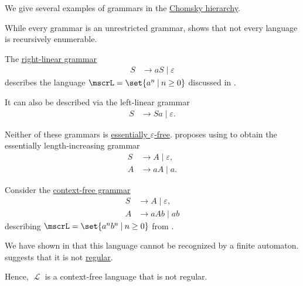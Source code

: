 \begin{example}\label{ex:def:chomsky_hierarchy}
  We give several examples of grammars in the \hyperref[def:chomsky_hierarchy]{Chomsky hierarchy}.

  \begin{thmenum}
     While every grammar is an unrestricted grammar,  shows that not every language is recursively enumerable.

     The \hyperref[def:chomsky_hierarchy/regular]{right-linear grammar}
    \begin{equation*}
      \begin{aligned}
        S &\to aS \mid \varepsilon
      \end{aligned}
    \end{equation*}
    describes the language \( \mscrL = \set{ a^n \given n \geq 0 } \) discussed in .

    It can also be described via the left-linear grammar
    \begin{equation*}
      \begin{aligned}
        S &\to Sa \mid \varepsilon.
      \end{aligned}
    \end{equation*}

    Neither of these grammars is \hyperref[def:epsilon_free_grammar]{essentially \( \varepsilon \)-free}.  proposes using  to obtain the essentially length-increasing grammar
    \begin{equation*}
      \begin{aligned}
        S &\to A \mid \varepsilon, \\
        A &\to aA \mid a.
      \end{aligned}
    \end{equation*}

     Consider the \hyperref[def:chomsky_hierarchy/context_free]{context-free grammar}
    \begin{equation*}
      \begin{aligned}
        S &\to A \mid \varepsilon, \\
        A &\to aAb \mid ab
      \end{aligned}
    \end{equation*}
    describing \( \mscrL = \set{ a^n b^n \given n \geq 0 } \) from .

    We have shown in  that this language cannot be recognized by a finite automaton.  suggests that it is not \hyperref[def:chomsky_hierarchy/regular]{regular}.

    Hence, \( \mscrL \) is a context-free language that is not regular.
  \end{thmenum}
\end{example}

